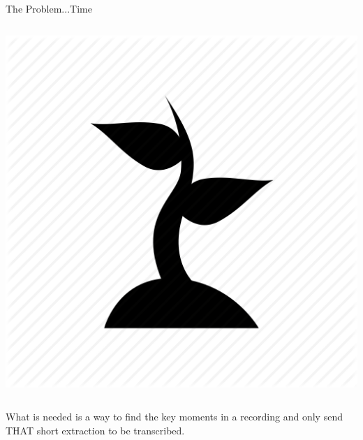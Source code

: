 \documentclass{beamer}
\begin{document}
\begin{frame}{The Problem...Time}
\begin{columns}
\begin{column}{0.5\textwidth}
\includegraphics[scale=0.1]{Pictures/Sprout.png}
\end{column}
\end{columns}

What is needed is a way to find the key moments in a recording and only send THAT short extraction to be transcribed.

\end{frame}
\end{document}
